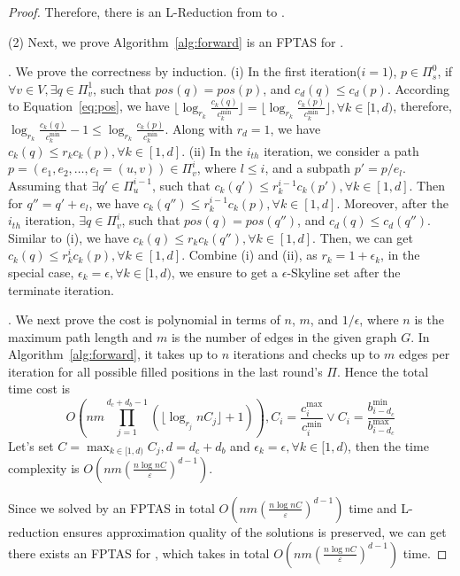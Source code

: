 {\begin{proof}
Therefore, there is an L-Reduction from \modata to \mos.

(2) Next, we prove Algorithm~\ref{alg:forward} is an FPTAS for \mos. 

. 
We prove the correctness by induction. 
(i) In the first iteration($i=1$), $p \in \Pi^0_s$, if $\forall v \in V, \exists q \in \Pi_v^1$, such that $pos(q) = pos(p)$, and $c_d(q) \leq c_d(p)$. According to Equation~\ref{eq:pos}, we have $\lfloor\log _{r_k} \frac{c_k(q)}{c_k^{\min }}\rfloor=\lfloor\log _{r_k} \frac{c_k(p)}{c_k^{\min }}\rfloor, \forall k \in [1, d)$, therefore, $\log _{r_k} \frac{c_k(q)}{c_k^{\min }} - 1 \leq \log _{r_k} \frac{c_k(p)}{c_k^{\min }}$. Along with $r_d=1$, we have $c_k(q) \leq r_k c_k(p), \forall k \in [1, d]$. 
(ii) In the $i_{th}$ iteration, we consider a path $p=(e_1, e_2, \ldots, e_l=(u, v)) \in \Pi^i_v$, where $l \leq i$, and a subpath $p' = p/e_l$. Assuming that $\exists q' \in \Pi^{i-1}_u$, such that $c_k(q') \leq r^{i-1}_k c_k(p'), \forall k \in [1, d]$. Then for $q'' = q' + e_l$, we have $c_k(q'') \leq r^{i-1}_k c_k(p), \forall k \in [1, d]$. Moreover, after the $i_{th}$ iteration, $\exists q \in \Pi^i_v$, such that $pos(q)=pos(q'')$, and $c_d(q) \leq c_d(q'')$. Similar to (i), we have $c_k(q) \leq r_k c_k(q''), \forall k \in [1, d]$. Then, we can get $c_k(q) \leq r^i_k c_k(p), \forall k \in [1, d]$. Combine (i) and (ii), as $r_k=1+\epsilon_k$, in the special case, $\epsilon_k=\epsilon, \forall k \in [1, d)$, we ensure to get a $\epsilon$-Skyline set after the terminate iteration.

. We next prove the cost is polynomial in terms of $n$, $m$, and $1/\epsilon$,  where $n$ is the maximum path length and $m$ is the number of edges in the given graph $G$. In Algorithm~\ref{alg:forward}, it takes up to $n$ iterations and checks up to $m$ edges per iteration for all possible filled positions in the last round's $\Pi$. Hence the total time cost is
$$O\left(n m \prod_{j=1}^{d_c + d_b-1}\left(\lfloor\log _{r_{j}}nC_{j}\rfloor+1\right)\right), C_{i}=\frac{c_{i}^{\max}}{c_{i}^{\min}} \vee C_{i}=\frac{b_{i-d_c}^{\min}}{b_{i-d_c}^{\max}}$$
Let's set $C=\max_{k\in [1,d)} C_j, d=d_c+d_b$ and $\epsilon_k=\epsilon, \forall k \in [1, d)$, then the time complexity is $O\left(n m\left(\frac{n \log nC}{\varepsilon}\right)^{d-1}\right)$.

Since we solved \mos by an FPTAS in total $O\left(n m\left(\frac{n \log nC}{\varepsilon}\right)^{d-1}\right)$ time and L-reduction ensures approximation quality of the solutions is preserved, we can get there exists an FPTAS for \modata, which takes in total $O\left(n m\left(\frac{n \log nC}{\varepsilon}\right)^{d-1}\right)$ time.

\end{proof}
}

